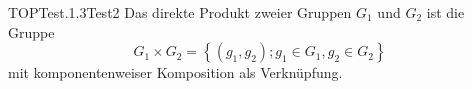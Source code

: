 \begin{DEF}{TOPTest.1.3}{Test2}
Das direkte Produkt zweier Gruppen $G_1$ und $G_2$ ist die Gruppe
    $$
    G_1 \times G_2=\left\{\left(g_1, g_2\right) ; g_1 \in G_1, g_2 \in G_2\right\}
    $$
    mit komponentenweiser Komposition als Verknüpfung.
\end{DEF}
